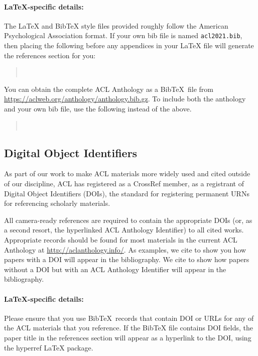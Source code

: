 \documentclass[11pt,a4paper]{article}
\begin{document}
	
	\paragraph{\LaTeX-specific details:}
	The \LaTeX{} and Bib\TeX{} style files provided roughly follow the American Psychological Association format.
	If your own bib file is named \texttt{\small acl2021.bib}, then placing the following before any appendices in your \LaTeX{}  file will generate the references section for you:
	\begin{quote}\small
		\verb||\\
		\verb||
	\end{quote}
	
	You can obtain the complete ACL Anthology as a Bib\TeX\ file from \url{https://aclweb.org/anthology/anthology.bib.gz}.
	To include both the anthology and your own bib file, use the following instead of the above.
	\begin{quote}\small
		\verb||\\
		\verb||
	\end{quote}
	
	
	\subsection{Digital Object Identifiers}
	As part of our work to make ACL materials more widely used and cited outside of our discipline, ACL has registered as a CrossRef member, as a registrant of Digital Object Identifiers (DOIs), the standard for registering permanent URNs for referencing scholarly materials.
	
	All camera-ready references are required to contain the appropriate DOIs (or, as a second resort, the hyperlinked ACL Anthology Identifier) to all cited works.
	Appropriate records should be found for most materials in the current ACL Anthology at \url{http://aclanthology.info/}.
	As examples, we cite \citep{goodman-etal-2016-noise} to show you how papers with a DOI will appear in the bibliography.
	We cite \citep{harper-2014-learning} to show how papers without a DOI but with an ACL Anthology Identifier will appear in the bibliography.
	
	\paragraph{\LaTeX-specific details:}
	Please ensure that you use Bib\TeX\ records that contain DOI or URLs for any of the ACL materials that you reference.
	If the Bib\TeX{} file contains DOI fields, the paper title in the references section will appear as a hyperlink to the DOI, using the hyperref \LaTeX{} package.
	
\end{document}
